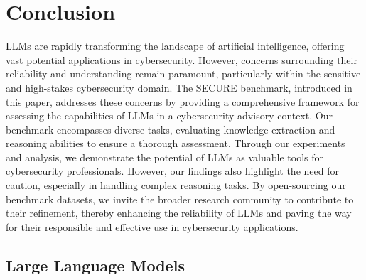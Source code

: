 \documentclass[conference]{IEEEtran}
\begin{document}
\section{Conclusion}\label{sec:conclusion}
LLMs are rapidly transforming the landscape of artificial intelligence, offering vast potential applications in cybersecurity. However, concerns surrounding their reliability and understanding remain paramount, particularly within the sensitive and high-stakes cybersecurity domain. The SECURE benchmark, introduced in this paper, addresses these concerns by providing a comprehensive framework for assessing the capabilities of LLMs in a cybersecurity advisory context. Our benchmark encompasses diverse tasks, evaluating knowledge extraction and reasoning abilities to ensure a thorough assessment. Through our experiments and analysis, we demonstrate the potential of LLMs as valuable tools for cybersecurity professionals. However, our findings also highlight the need for caution, especially in handling complex reasoning tasks. By open-sourcing our benchmark datasets, we invite the broader research community to contribute to their refinement, thereby enhancing the reliability of LLMs and paving the way for their responsible and effective use in cybersecurity applications.

\newpage





\appendix

\subsection{Large Language Models}\label{appendix:models}
\end{document}
